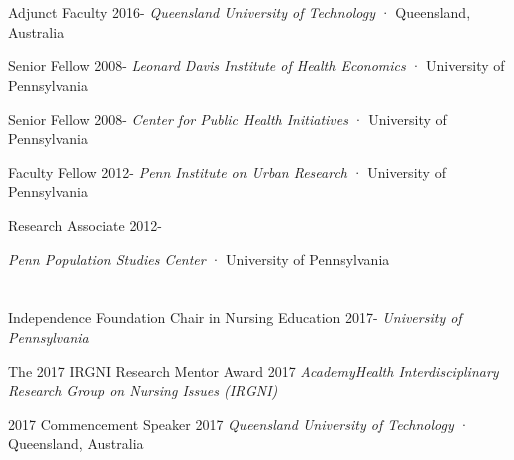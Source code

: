 \documentclass[10pt,]{article}
\begin{document}
{{{{{\section{\Large {}}

Adjunct Faculty \hfill {2016-{\small{}}} \newline
\hspace*{0.5cm} {\textit {Queensland University of Technology}} · Queensland, Australia

Senior Fellow  \hfill {2008-{\small{}}} \newline
\hspace*{0.5cm} {\textit {Leonard Davis Institute of Health Economics}} · University of Pennsylvania

Senior Fellow  \hfill {2008-{\small{}}} \newline
\hspace*{0.5cm} {\textit {Center for Public Health Initiatives}} · University of Pennsylvania

Faculty Fellow  \hfill {2012-{\small{}}} \newline
\hspace*{0.5cm} {\textit {Penn Institute on Urban Research}} · University of Pennsylvania 

Research Associate \hfill {2012-{\small{}}} \newline
\hspace*{0.5cm} {\textit {Penn Population Studies Center} · University of Pennsylvania

\section{\Large {}}

Independence Foundation Chair in Nursing Education \hfill {2017-{\small{}}} \newline
\hspace*{0.5cm} {\textit {University of Pennsylvania}}

The 2017 IRGNI Research Mentor Award  \hfill 2017	\newline
\hspace*{0.5cm} {\textit {AcademyHealth Interdisciplinary Research Group on Nursing Issues (IRGNI)}} 

2017 Commencement Speaker \hfill 2017	\newline
\hspace*{0.5cm} {\textit {Queensland University of Technology}} · Queensland, Australia

}}}}}}
\end{document}
